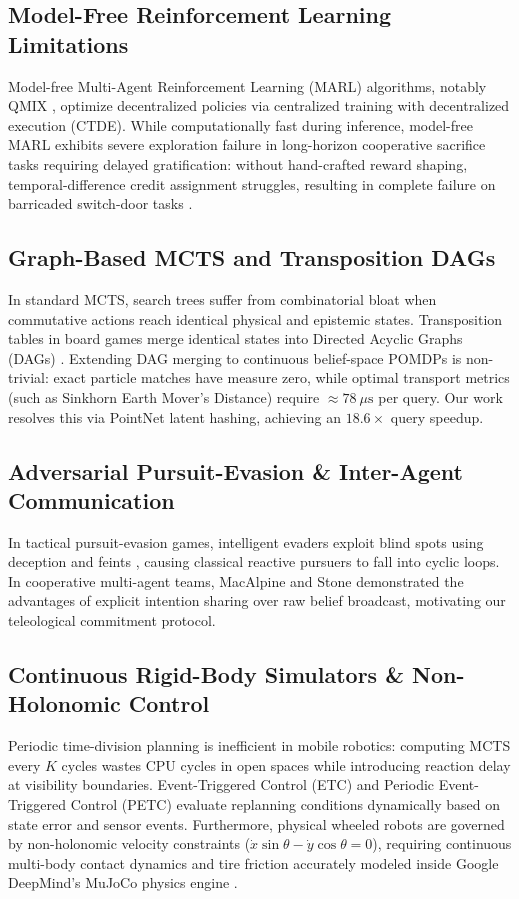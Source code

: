 \documentclass[conference]{IEEEtran}
\begin{document}
\subsection{Model-Free Reinforcement Learning Limitations}
Model-free Multi-Agent Reinforcement Learning (MARL) algorithms, notably QMIX \cite{rashid2018qmix}, optimize decentralized policies via centralized training with decentralized execution (CTDE). While computationally fast during inference, model-free MARL exhibits severe exploration failure in long-horizon cooperative sacrifice tasks requiring delayed gratification: without hand-crafted reward shaping, temporal-difference credit assignment struggles, resulting in complete failure on barricaded switch-door tasks \cite{rashid2018qmix}.

\subsection{Graph-Based MCTS and Transposition DAGs}
In standard MCTS, search trees suffer from combinatorial bloat when commutative actions reach identical physical and epistemic states. Transposition tables in board games merge identical states into Directed Acyclic Graphs (DAGs) \cite{silver2017mastering}. Extending DAG merging to continuous belief-space POMDPs is non-trivial: exact particle matches have measure zero, while optimal transport metrics (such as Sinkhorn Earth Mover's Distance) require $\approx 78\ \mu\text{s}$ per query. Our work resolves this via PointNet latent hashing, achieving an $18.6\times$ query speedup.

\subsection{Adversarial Pursuit-Evasion \& Inter-Agent Communication}
In tactical pursuit-evasion games, intelligent evaders exploit blind spots using deception and feints \cite{aleksandrov2021pursuit}, causing classical reactive pursuers to fall into cyclic loops. In cooperative multi-agent teams, MacAlpine and Stone \cite{macalpine2018customized} demonstrated the advantages of explicit intention sharing over raw belief broadcast, motivating our teleological commitment protocol.

\subsection{Continuous Rigid-Body Simulators \& Non-Holonomic Control}
Periodic time-division planning is inefficient in mobile robotics: computing MCTS every $K$ cycles wastes CPU cycles in open spaces while introducing reaction delay at visibility boundaries. Event-Triggered Control (ETC) and Periodic Event-Triggered Control (PETC) \cite{tabuada2007event} evaluate replanning conditions dynamically based on state error and sensor events. Furthermore, physical wheeled robots are governed by non-holonomic velocity constraints ($\dot{x}\sin\theta - \dot{y}\cos\theta = 0$), requiring continuous multi-body contact dynamics and tire friction accurately modeled inside Google DeepMind's MuJoCo physics engine \cite{todorov2012mujoco}.
\end{document}
